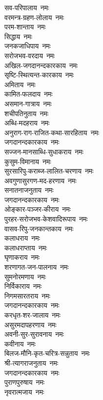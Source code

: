 \begin{flushleft}
\begin{multicols}{2}
सव-परिपालाय~नमः\hfill{}\\
वरमन्त्र-ग्रहण-लोलाय~नमः\\
परम-शान्ताय~नमः\\
सिद्धाय~नमः\\
जनकजाधिपाय~नमः\\
सरोजभव-वरदाय~नमः\\
अखिल-जगदानन्दकारकाय~नमः\\
सृष्टि-स्थित्यन्त-कारकाय~नमः\\
अमिताय~नमः\\
कामित-फलदाय~नमः\\
असमान-गात्राय~नमः\hfill{}\\
शचीपतिनुताय~नमः\\
अब्धि-मदहराय~नमः\\
अनुराग-राग-राजित-कथा-सारहिताय~नमः\\
जगदानन्दकारकाय~नमः\\
सज्जन-मानसाब्धि-सुधाकराय~नमः\\
कुसुम-विमानाय~नमः\\
सुरसारिपु-कराब्ज-लालित-चरणाय~नमः\\
अवगुणासुरगण-मद-हरणाय~नमः\\
सनातनाजनुताय~नमः\\
जगदानन्दकारकाय~नमः\hfill{}\\
ओङ्कार-पञ्जर-कीराय~नमः\\
पुरहर-सरोजभव-केशवादिरूपाय~नमः\\
वासव-रिपु-जनकान्तकाय~नमः\\
कलाधराय~नमः\\
कलाधराप्ताय~नमः\\
घृणाकराय~नमः\\
शरणागत-जन-पालनाय~नमः\\
सुमनोरमणाय~नमः\\
निर्विकाराय~नमः\\
निगमसारतराय~नमः\hfill{}\\
जगदानन्दकारकाय~नमः\\
करधृत-शर-जालाय~नमः\\
असुरमदापहरणाय~नमः\\
अवनी-सुर-सुरावनाय~नमः\\
कवीनाय~नमः\\
बिलज-मौनि-कृत-चरित्र-सन्नुताय~नमः\\
श्री-त्यागराजनुताय~नमः\\
जगदानन्दकारकाय~नमः\\
पुराणपुरुषाय~नमः\\
नृवरात्मजाय~नमः\hfill{}\\

\end{multicols}
\end{flushleft}
